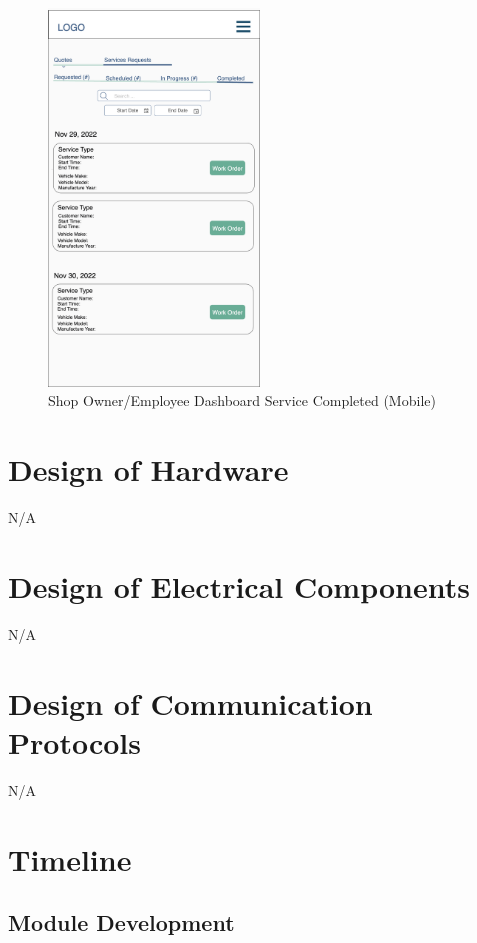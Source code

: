 \documentclass[12pt, titlepage]{article}
\begin{document}
\begin{figure}[H]
	\centering
	\includegraphics[width=0.5\textwidth]{mockups/Shop Owner Dashboard (Service Requests - Completed) (Mobile).png}
	\caption{Shop Owner/Employee Dashboard \textemdash{} Service \textemdash{} Completed (Mobile)}
\end{figure}

\section{Design of Hardware}
N/A

\section{Design of Electrical Components}
N/A

\section{Design of Communication Protocols}
N/A

\section{Timeline}

\subsection{Module Development}
\end{document}

